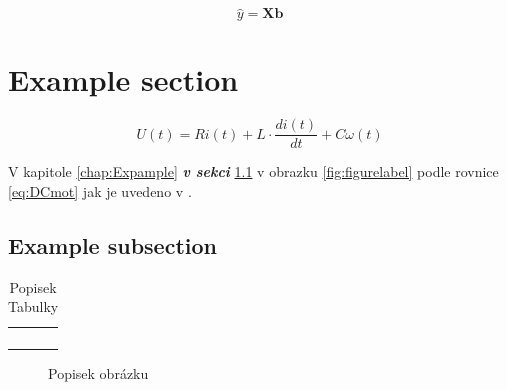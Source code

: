 \begin{equation}\label{eq:LS_model}
\hat{y} = \bm{X} \bm{b}
\end{equation}

\section{Example section}
\label{sec:Example-section}

\begin{equation}\label{eq:DCmot2}
U(t) = Ri(t) + L\cdot\frac{di(t)}{dt} + C\omega(t)
\end{equation}


V kapitole \ref{chap:Expample} \textbf{\textit{v sekci}} \ref{sec:Example-subsection} v obrazku \ref{fig:figurelabel} podle rovnice \ref{eq:DCmot} jak je uvedeno v \cite{Blaha}.




\subsection{Example subsection}
\label{sec:Example-subsection}
\lipsum[6]
\lipsum[7]


\begin{table}[!h] %
	\begin{center}
		\begin{tabular}{ccc}
				&  &  \\ 
				&  &  \\ 
				&  &  \\ 
				&  & 

		\end{tabular}
	\end{center}
	\caption[Kratky popisek tabulky]{Popisek Tabulky \cite{Atkeson1996}}
	\label{tab:car4Param}
\end{table}


\lipsum

\begin{figure}[!ht] 
	\begin{center}
	\end{center}
	\caption[Kratky popisek]{Popisek obrázku}
	\label{fig:LLM_init}
\end{figure}

